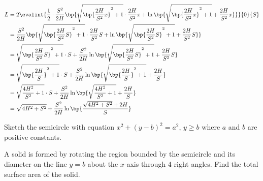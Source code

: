 \documentclass{echw}
\begin{document}
            {\allowdisplaybreaks
            \begin{align*}
                L &= 2\evalint{\dfrac1{2} \cdot \dfrac{S^2}{2H} \bp{\sqrt{\bp{\dfrac{2H}{S^2}x}^2 + 1} \cdot \dfrac{2H}{S^2}x + \ln \bp{\sqrt{\bp{\dfrac{2H}{S^2}x}^2 + 1} + \dfrac{2H}{S^2}x}}}{0}{S}\\
                &= \dfrac{S^2}{2H} \bp{\sqrt{\bp{\dfrac{2H}{S^2}S}^2 + 1} \cdot \dfrac{2H}{S^2}S + \ln \bp{\sqrt{\bp{\dfrac{2H}{S^2}S}^2 + 1} + \dfrac{2H}{S^2}S}}\\
                &= \sqrt{\bp{\dfrac{2H}{S^2}S}^2 + 1} \cdot S + \dfrac{S^2}{2H} \ln \bp{\sqrt{\bp{\dfrac{2H}{S^2}S}^2 + 1} + \dfrac{2H}{S^2}S}\\
                &= \sqrt{\bp{\dfrac{2H}{S}}^2 + 1} \cdot S + \dfrac{S^2}{2H} \ln \bp{\sqrt{\bp{\dfrac{2H}{S}}^2 + 1} + \dfrac{2H}{S}}\\
                &= \sqrt{\dfrac{4H^2}{S^2} + 1} \cdot S + \dfrac{S^2}{2H} \ln \bp{\sqrt{\dfrac{4H^2}{S^2} + 1} + \dfrac{2H}{S}}\\
                &= \sqrt{4H^2 + S^2} + \dfrac{S^2}{2H} \ln \bp{\dfrac{\sqrt{4H^2 + S^2} + 2H}{S}}
            \end{align*}}

    \problem{}
        Sketch the semicircle with equation $x^2 + (y-b)^2 = a^2$, $y \geq b$ where $a$ and $b$ are positive constants.

        A solid is formed by rotating the region bounded by the semicircle and its diameter on the line $y = b$ about the $x$-axis through 4 right angles. Find the total surface area of the solid.
\end{document}
